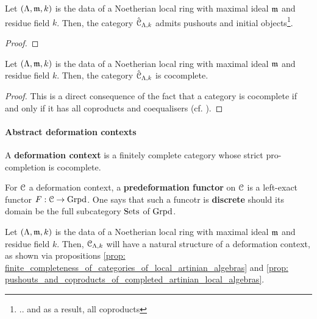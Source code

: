                 \begin{proposition} \label{prop: pushouts_and_coproducts_of_completed_artinian_local_algebras}
                    Let $(\Lambda, \mathfrak{m}, k)$ is the data of a Noetherian local ring with maximal ideal $\mathfrak{m}$ and residue field $k$. Then, the category $\hat{\mathcal{C}}_{\Lambda, k}$ admits pushouts and initial objects\footnote{.. and as a result, all coproducts}.
                \end{proposition}
                    \begin{proof}
                        
                    \end{proof}
                \begin{corollary}
                    Let $(\Lambda, \mathfrak{m}, k)$ is the data of a Noetherian local ring with maximal ideal $\mathfrak{m}$ and residue field $k$. Then, the category $\hat{\mathcal{C}}_{\Lambda, k}$ is cocomplete.
                \end{corollary}
                    \begin{proof}
                        This is a direct consequence of the fact that a category is cocomplete if and only if it has all coproducts and coequalisers (cf. \cite[Theorem V.2.1]{maclane}).
                    \end{proof}
                    
            \paragraph{Abstract deformation contexts}
                \begin{definition} \label{def: deformation_context}
                    A \textbf{deformation context} is a finitely complete category whose strict pro-completion is cocomplete. 
                \end{definition}
                \begin{definition} \label{def: predeformation_functors}
                    For $\mathcal{C}$ a deformation context, a \textbf{predeformation functor} on $\mathcal{C}$ is a left-exact functor $F: \mathcal{C} \to \mathrm{Grpd}$. One says that such a funcotr is \textbf{discrete} should its domain be the full subcategory $\mathrm{Sets}$ of $\mathrm{Grpd}$.
                \end{definition}
                \begin{example}
                    Let $(\Lambda, \mathfrak{m}, k)$ is the data of a Noetherian local ring with maximal ideal $\mathfrak{m}$ and residue field $k$. Then, $\mathcal{C}_{\Lambda, k}$ will have a natural structure of a deformation context, as shown via propositions \ref{prop: finite_completeness_of_categories_of_local_artinian_algebras} and \ref{prop: pushouts_and_coproducts_of_completed_artinian_local_algebras}.
                \end{example}
                
